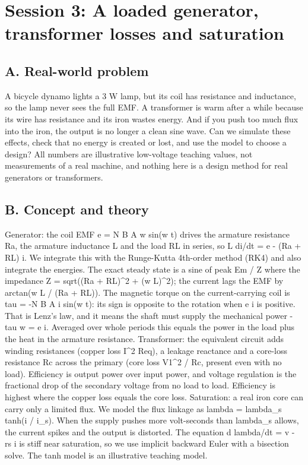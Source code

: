 \documentclass[11pt,a4paper]{article}
\begin{document}
\section{Session 3: A loaded generator, transformer losses and saturation}

\subsection*{A. Real-world problem}
A bicycle dynamo lights a 3 W lamp, but its coil has resistance and inductance, so the lamp never sees the full EMF. A transformer is warm after a while because its wire has resistance and its iron wastes energy. And if you push too much flux into the iron, the output is no longer a clean sine wave. Can we simulate these effects, check that no energy is created or lost, and use the model to choose a design? All numbers are illustrative low-voltage teaching values, not measurements of a real machine, and nothing here is a design method for real generators or transformers.

\subsection*{B. Concept and theory}
Generator: the coil EMF e = N B A w sin(w t) drives the armature resistance Ra, the armature inductance L and the load RL in series, so L di/dt = e - (Ra + RL) i. We integrate this with the Runge-Kutta 4th-order method (RK4) and also integrate the energies. The exact steady state is a sine of peak Em / Z where the impedance Z = sqrt((Ra + RL)\textasciicircum{}2 + (w L)\textasciicircum{}2); the current lags the EMF by arctan(w L / (Ra + RL)). The magnetic torque on the current-carrying coil is tau = -N B A i sin(w t): its sign is opposite to the rotation when e i is positive. That is Lenz's law, and it means the shaft must supply the mechanical power -tau w = e i. Averaged over whole periods this equals the power in the load plus the heat in the armature resistance. Transformer: the equivalent circuit adds winding resistances (copper loss I\textasciicircum{}2 Req), a leakage reactance and a core-loss resistance Rc across the primary (core loss V1\textasciicircum{}2 / Rc, present even with no load). Efficiency is output power over input power, and voltage regulation is the fractional drop of the secondary voltage from no load to load. Efficiency is highest where the copper loss equals the core loss. Saturation: a real iron core can carry only a limited flux. We model the flux linkage as lambda = lambda\_s tanh(i / i\_s). When the supply pushes more volt-seconds than lambda\_s allows, the current spikes and the output is distorted. The equation d lambda/dt = v - rs i is stiff near saturation, so we use implicit backward Euler with a bisection solve. The tanh model is an illustrative teaching model.
\end{document}
